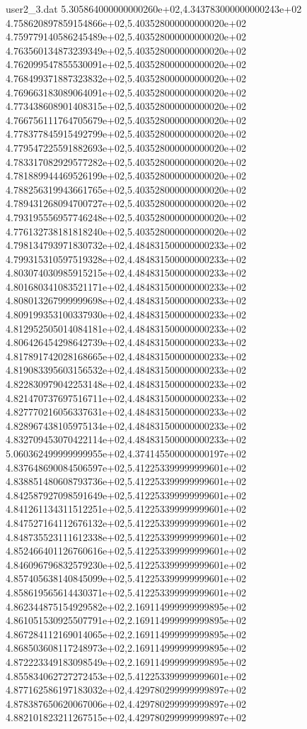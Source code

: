\begin{filecontents}{user2_3.dat}
5.305864000000000260e+02,4.343783000000000243e+02
4.758620897859154866e+02,5.403528000000000020e+02
4.759779140586245489e+02,5.403528000000000020e+02
4.763560134873239349e+02,5.403528000000000020e+02
4.762099547855530091e+02,5.403528000000000020e+02
4.768499371887323832e+02,5.403528000000000020e+02
4.769663183089064091e+02,5.403528000000000020e+02
4.773438608901408315e+02,5.403528000000000020e+02
4.766756111764705679e+02,5.403528000000000020e+02
4.778377845915492799e+02,5.403528000000000020e+02
4.779547225591882693e+02,5.403528000000000020e+02
4.783317082929577282e+02,5.403528000000000020e+02
4.781889944469526199e+02,5.403528000000000020e+02
4.788256319943661765e+02,5.403528000000000020e+02
4.789431268094700727e+02,5.403528000000000020e+02
4.793195556957746248e+02,5.403528000000000020e+02
4.776132738181818240e+02,5.403528000000000020e+02
4.798134793971830732e+02,4.484831500000000233e+02
4.799315310597519328e+02,4.484831500000000233e+02
4.803074030985915215e+02,4.484831500000000233e+02
4.801680341083521171e+02,4.484831500000000233e+02
4.808013267999999698e+02,4.484831500000000233e+02
4.809199353100337930e+02,4.484831500000000233e+02
4.812952505014084181e+02,4.484831500000000233e+02
4.806426454298642739e+02,4.484831500000000233e+02
4.817891742028168665e+02,4.484831500000000233e+02
4.819083395603156532e+02,4.484831500000000233e+02
4.822830979042253148e+02,4.484831500000000233e+02
4.821470737697516711e+02,4.484831500000000233e+02
4.827770216056337631e+02,4.484831500000000233e+02
4.828967438105975134e+02,4.484831500000000233e+02
4.832709453070422114e+02,4.484831500000000233e+02
5.060362499999999955e+02,4.374145500000000197e+02
4.837648690084506597e+02,5.412253399999999601e+02
4.838851480608793736e+02,5.412253399999999601e+02
4.842587927098591649e+02,5.412253399999999601e+02
4.841261134311512251e+02,5.412253399999999601e+02
4.847527164112676132e+02,5.412253399999999601e+02
4.848735523111612338e+02,5.412253399999999601e+02
4.852466401126760616e+02,5.412253399999999601e+02
4.846096796832579230e+02,5.412253399999999601e+02
4.857405638140845099e+02,5.412253399999999601e+02
4.858619565614430371e+02,5.412253399999999601e+02
4.862344875154929582e+02,2.169114999999999895e+02
4.861051530925507791e+02,2.169114999999999895e+02
4.867284112169014065e+02,2.169114999999999895e+02
4.868503608117248973e+02,2.169114999999999895e+02
4.872223349183098549e+02,2.169114999999999895e+02
4.855834062727272453e+02,5.412253399999999601e+02
4.877162586197183032e+02,4.429780299999999897e+02
4.878387650620067006e+02,4.429780299999999897e+02
4.882101823211267515e+02,4.429780299999999897e+02

\end{filecontents}

